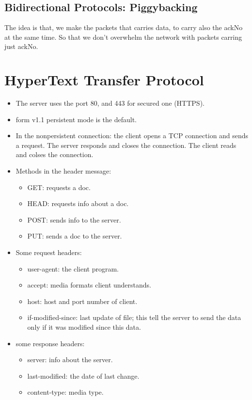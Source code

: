 \documentclass{article}
\begin{document}
\subsection{Bidirectional Protocols: Piggybacking}%
\label{subsec:bidre}

The idea is that, we make the packets that carries data, to carry also the ackNo at
the same time. So that we don't overwhelm the network with packets carring just ackNo.



\section{HyperText Transfer Protocol}%
\label{sec:HTTP}

\begin{itemize}
  \item The server uses the port 80, and 443 for secured one (HTTPS).
  \item form v1.1 persistent mode is the default.
  \item In the nonpersistent connection: the client opens a TCP connection and sends a request.
        The server responds and closes the connection. The client reads and colses the connection.
  \item Methods in the header message:
        \begin{itemize}
          \item GET: requests a doc.
          \item HEAD: requests info about a doc.
          \item POST: sends info to the server.
          \item PUT: sends a doc to the server.
        \end{itemize}
  \item Some request headers:
        \begin{itemize}
          \item user-agent: the client program.
          \item accept: media formats client understands.
          \item host: host and port number of client.
          \item if-modified-since: last update of file; this tell the server
                to send the data only if it was modified since this data.
        \end{itemize}
  \item some response headers:
        \begin{itemize}
          \item server: info about the server.
          \item last-modified: the date of last change.
          \item content-type: media type.
        \end{itemize}
\end{itemize}
\end{document}
